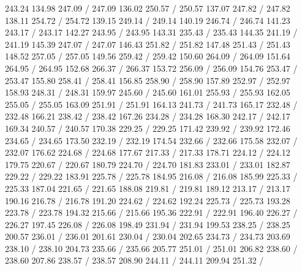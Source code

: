 { 243.24 134.98 247.09 /
 247.09 136.02 250.57 /
 250.57 137.07 247.82 /
 247.82 138.11 254.72 /
 254.72 139.15 249.14 /
 249.14 140.19 246.74 /
 246.74 141.23 243.17 /
 243.17 142.27 243.95 /
 243.95 143.31 235.43 /
 235.43 144.35 241.19 /
 241.19 145.39 247.07 /
 247.07 146.43 251.82 /
 251.82 147.48 251.43 /
 251.43 148.52 257.05 /
 257.05 149.56 259.42 /
 259.42 150.60 264.09 /
 264.09 151.64 264.95 /
 264.95 152.68 266.37 /
 266.37 153.72 256.09 /
 256.09 154.76 253.47 /
 253.47 155.80 258.41 /
 258.41 156.85 258.90 /
 258.90 157.89 252.97 /
 252.97 158.93 248.31 /
 248.31 159.97 245.60 /
 245.60 161.01 255.93 /
 255.93 162.05 255.05 /
 255.05 163.09 251.91 /
 251.91 164.13 241.73 /
 241.73 165.17 232.48 /
 232.48 166.21 238.42 /
 238.42 167.26 234.28 /
 234.28 168.30 242.17 /
 242.17 169.34 240.57 /
 240.57 170.38 229.25 /
 229.25 171.42 239.92 /
 239.92 172.46 234.65 /
 234.65 173.50 232.19 /
 232.19 174.54 232.66 /
 232.66 175.58 232.07 /
 232.07 176.62 224.68 /
 224.68 177.67 217.33 /
 217.33 178.71 224.12 /
 224.12 179.75 220.67 /
 220.67 180.79 224.70 /
 224.70 181.83 233.01 /
 233.01 182.87 229.22 /
 229.22 183.91 225.78 /
 225.78 184.95 216.08 /
 216.08 185.99 225.33 /
 225.33 187.04 221.65 /
 221.65 188.08 219.81 /
 219.81 189.12 213.17 /
 213.17 190.16 216.78 /
 216.78 191.20 224.62 /
 224.62 192.24 225.73 /
 225.73 193.28 223.78 /
 223.78 194.32 215.66 /
 215.66 195.36 222.91 /
 222.91 196.40 226.27 /
 226.27 197.45 226.08 /
 226.08 198.49 231.94 /
 231.94 199.53 238.25 /
 238.25 200.57 236.01 /
 236.01 201.61 230.04 /
 230.04 202.65 234.73 /
 234.73 203.69 238.10 /
 238.10 204.73 235.66 /
 235.66 205.77 251.01 /
 251.01 206.82 238.60 /
 238.60 207.86 238.57 /
 238.57 208.90 244.11 /
 244.11 209.94 251.32 /
}
